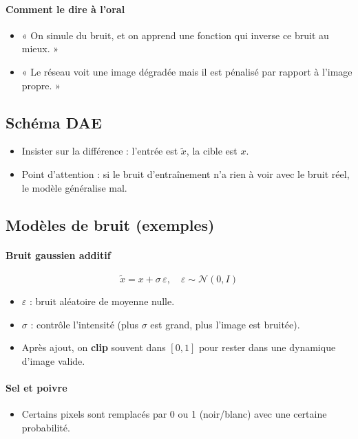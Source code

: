\documentclass[11pt,a4paper]{article}
\begin{document}
\paragraph{Comment le dire à l'oral}
\begin{itemize}
  \item « On simule du bruit, et on apprend une fonction qui inverse ce bruit au mieux. »
  \item « Le réseau voit une image dégradée mais il est pénalisé par rapport à l'image propre. »
\end{itemize}

\subsection{Schéma DAE}
\begin{itemize}
  \item Insister sur la différence : l'entrée est $\tilde{x}$, la cible est $x$.
  \item Point d'attention : si le bruit d'entraînement n'a rien à voir avec le bruit réel, le modèle généralise mal.
\end{itemize}

\subsection{Modèles de bruit (exemples)}
\paragraph{Bruit gaussien additif}
\[
  \tilde{x} = x + \sigma\,\varepsilon,\quad \varepsilon\sim\mathcal{N}(0,I)
\]
\begin{itemize}
  \item $\varepsilon$ : bruit aléatoire de moyenne nulle.
  \item $\sigma$ : contrôle l'intensité (plus $\sigma$ est grand, plus l'image est bruitée).
  \item Après ajout, on \textbf{clip} souvent dans $[0,1]$ pour rester dans une dynamique d'image valide.
\end{itemize}

\paragraph{Sel et poivre}
\begin{itemize}
  \item Certains pixels sont remplacés par 0 ou 1 (noir/blanc) avec une certaine probabilité.
\end{itemize}
\end{document}
